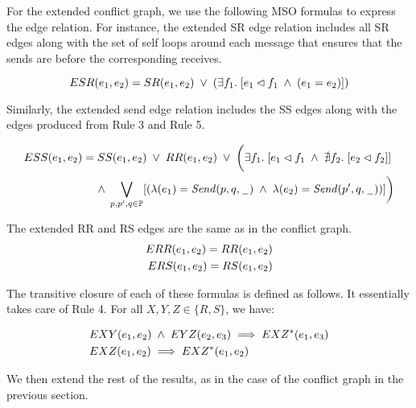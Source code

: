 For the extended conflict graph, we use the following MSO formulas to express the edge relation. For instance, the extended SR edge relation includes all SR %
edges along with the set of self loops around each message that ensures that the sends are before the corresponding receives.

\begin{equation*}
\XYformula{ESR}(e_1, e_2) = \XYformula{SR}(e_1,e_2) \; \vee \; (\exists f_1.\; [e_1 \lhd f_1  \; \wedge \; (e_1 = e_2)  ])
\end{equation*}

Similarly, the extended send edge relation includes the SS edges along with the edges produced from Rule 3 and Rule 5.

	\begin{align*}
		\XYformula{ESS}(e_1, e_2) = \XYformula{SS}(e_1,e_2) \; \vee \;  \XYformula{RR}(e_1, e_2) \; \vee \; \biggl(  \exists f_1.\; [e_1 \lhd f_1 \; \wedge \; \nexists f_2. \; [e_2 \lhd f_2]] \; \\
		 \wedge \; \bigvee_{p, p',q \in \Procs}[(\lambda(e_1) =  \pqsAct{p}{q} \; \wedge \; \lambda(e_2) =  \pqsAct{p'}{q} ) ]\biggr)
	\end{align*}

The extended RR and RS edges are the same as in the conflict graph.
\begin{align*}
		\XYformula{ERR}(e_1, e_2) = \XYformula{RR}(e_1, e_2) \\
\XYformula{ERS}(e_1, e_2) = \XYformula{RS}(e_1, e_2)
\end{align*}

The transitive closure of each of these formulas is defined as follows. It essentially takes care of Rule 4. For all $X,Y,Z \in \{R, S\}$, we have:

\begin{align*}
	&\XYformula{EXY}(e_1, e_2)  \; \wedge \; \XYformula{EYZ}(e_2, e_3)  \implies \XYformula{EXZ^*}(e_1, e_3)\\
	&\XYformula{EXZ}(e_1, e_2) \implies \XYformula{EXZ^*}(e_1, e_2)
\end{align*}

We then extend the rest of the results, as in the case of the conflict graph in the previous section.

%

